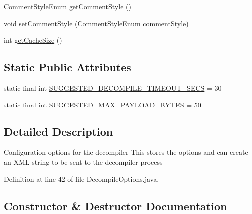 \begin{DoxyCompactItemize}
\item 
\mbox{\hyperlink{enumghidra_1_1app_1_1decompiler_1_1_decompile_options_1_1_comment_style_enum}{Comment\+Style\+Enum}} \mbox{\hyperlink{classghidra_1_1app_1_1decompiler_1_1_decompile_options_a14dac87795d3d0e632384682723844d9}{get\+Comment\+Style}} ()
\item 
void \mbox{\hyperlink{classghidra_1_1app_1_1decompiler_1_1_decompile_options_af2f9f7110faa0a794ff8930d259247e2}{set\+Comment\+Style}} (\mbox{\hyperlink{enumghidra_1_1app_1_1decompiler_1_1_decompile_options_1_1_comment_style_enum}{Comment\+Style\+Enum}} comment\+Style)
\item 
int \mbox{\hyperlink{classghidra_1_1app_1_1decompiler_1_1_decompile_options_a9ba66ce988f907c50bef0a1798435649}{get\+Cache\+Size}} ()
\end{DoxyCompactItemize}
\subsection*{Static Public Attributes}
\begin{DoxyCompactItemize}
\item 
static final int \mbox{\hyperlink{classghidra_1_1app_1_1decompiler_1_1_decompile_options_aca4d1e8a516c8147ae08af51ae617f54}{S\+U\+G\+G\+E\+S\+T\+E\+D\+\_\+\+D\+E\+C\+O\+M\+P\+I\+L\+E\+\_\+\+T\+I\+M\+E\+O\+U\+T\+\_\+\+S\+E\+CS}} = 30
\item 
static final int \mbox{\hyperlink{classghidra_1_1app_1_1decompiler_1_1_decompile_options_a5be67a14073d55e4e4fb99b6474588a0}{S\+U\+G\+G\+E\+S\+T\+E\+D\+\_\+\+M\+A\+X\+\_\+\+P\+A\+Y\+L\+O\+A\+D\+\_\+\+B\+Y\+T\+ES}} = 50
\end{DoxyCompactItemize}


\subsection{Detailed Description}
Configuration options for the decompiler This stores the options and can create an X\+ML string to be sent to the decompiler process 

Definition at line 42 of file Decompile\+Options.\+java.



\subsection{Constructor \& Destructor Documentation}
\mbox{\label{classghidra_1_1app_1_1decompiler_1_1_decompile_options_a6f2f10e8774d7ff64b3fb1ddaa14e24c}} 
